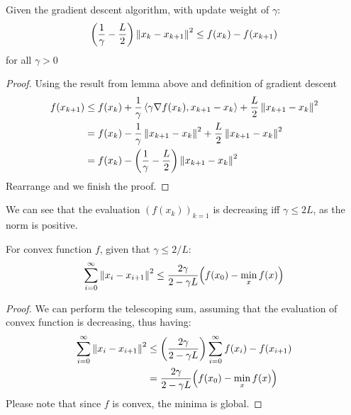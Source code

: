 \begin{proposition}
    \label{prop:gd-prop1}
    Given the gradient descent algorithm, with update weight of $\gamma$:
    \begin{equation*}
        \left( \frac{1}{\gamma} - \frac{L}{2} \right) \left\lVert x_k - x_{k+1}\right\rVert^2 \le f(x_k) - f(x_{k+1})
    \end{equation*}
    for all $\gamma > 0$
\end{proposition}
\begin{proof}
    Using the result from lemma above and definition of gradient descent
    \begin{equation*}
    \begin{aligned}
        f(x_{k+1}) &\le f(x_k) + \frac{1}{\gamma}\left\langle \gamma\nabla f(x_k), x_{k+1} - x_k \right\rangle + \frac{L}{2}\left\lVert x_{k+1}-x_k\right\rVert^2 \\
        &= f(x_k) - \frac{1}{\gamma}\left\lVert x_{k+1} - x_k\right\rVert^2 + \frac{L}{2}\left\lVert x_{k+1}-x_k\right\rVert^2 \\
        &= f(x_k) - \left( \frac{1}{\gamma} - \frac{L}{2} \right)\left\lVert x_{k+1}-x_k\right\rVert^2 \\
    \end{aligned}
    \end{equation*}
    Rearrange and we finish the proof.
\end{proof}

\begin{remark}
    We can see that the evaluation $(f(x_k))_{k=1}$ is decreasing iff $\gamma\le 2L$, as the norm is positive.
\end{remark}

\begin{lemma} 
    \label{lem:all-sum}
    For convex function $f$, given that $\gamma \le 2/L$:
    \begin{equation*}
        \sum^\infty_{i=0} \left\lVert x_i - x_{i+1}\right\rVert^2 \le \frac{2\gamma}{2-\gamma L} \Big( f(x_0) - \min_x f(x) \Big)
    \end{equation*}
\end{lemma}
\begin{proof}
    We can perform the telescoping sum, assuming that the evaluation of convex function is decreasing, thus having:
    \begin{equation*}
    \begin{aligned}
        \sum^\infty_{i=0} \left\lVert x_i - x_{i+1}\right\rVert^2 &\le \left( \frac{2\gamma}{2-\gamma L} \right)\sum^\infty_{i=0} f(x_i) - f(x_{i+1}) \\ 
        &= \frac{2\gamma}{2-\gamma L} \Big( f(x_0) - \min_x f(x) \Big)
    \end{aligned}
    \end{equation*}
    Please note that since $f$ is convex, the minima is global.
\end{proof}

